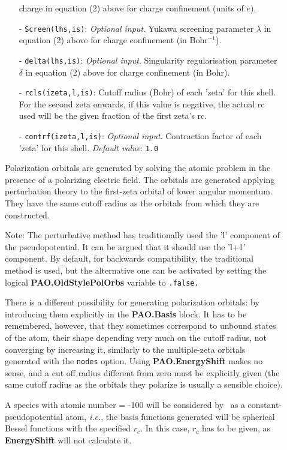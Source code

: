 \begin{description}
\begin{itemize}
charge in equation (2) above for charge confinement (units of $e$). 
\item[-] \texttt{Screen(lhs,is)}: \textit{Optional input}. Yukawa screening parameter
$\lambda$ in equation (2) above for charge confinement (in Bohr$^{-1}$).
\item[-] \texttt{delta(lhs,is)}: \textit{Optional input}. Singularity regularisation parameter
$\delta$ in equation (2) above for charge confinement (in Bohr).
\item[-] \texttt{rcls(izeta,l,is)}: Cutoff radius (Bohr) of
each 'zeta' for this shell. For the second zeta onwards, if this value
is negative, the actual rc used will be the given fraction of the
first zeta's rc.
\item[-] \texttt{contrf(izeta,l,is)}: \textit{Optional input}.
Contraction factor of
each 'zeta' for this shell.
\textit{Default value}: \texttt{1.0}
\end{itemize}

Polarization orbitals are generated by solving the
atomic problem in the presence of a polarizing electric field. The
orbitals are generated applying perturbation theory to the first-zeta
orbital of lower angular momentum.  They have the same cutoff radius
as the orbitals from which they are constructed.

Note: The perturbative method has traditionally used the 'l' component
of the pseudopotential. It can be argued that it should use the 'l+1'
component. By default, for backwards compatibility, the traditional
method is used, but the alternative one can be activated by setting
the logical \textbf{PAO.OldStylePolOrbs} variable to \texttt{.false.}

There is a different possibility for generating polarization orbitals:
by introducing them explicitly in the \textbf{PAO.Basis} block.
It has to be remembered, however, that they sometimes correspond to
unbound states of the atom, their shape depending very much on the
cutoff radius, not converging by increasing it, similarly to the
multiple-zeta orbitals generated with the \texttt{nodes} option.
Using \textbf{PAO.EnergyShift} makes no sense, and a cut off
radius different from zero must be explicitly given (the same cutoff radius
as the orbitals they polarize is usually a sensible choice).

A species with atomic number = -100 will be considered by \siesta\ as
a constant-pseudopotential atom, \textit{i.e.}, the basis functions
generated will be spherical Bessel functions
with the specified $r_c$. In this case, $r_c$ has to be given, as
\textbf{EnergyShift} will not calculate it.


\end{description}
